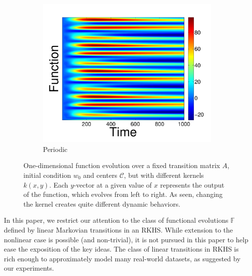 \documentclass[letterpaper,12pt,peerreviewca,draftcls]{IEEEtran}
\newcommand{\weight}{w}
\newcommand{\kernel}{k}
\newcommand{\shCent}{\mathcal{C}}
\begin{document}
\begin{figure}[t]
\begin{subfigure}[t]{0.32\textwidth}
	\includegraphics[width=\linewidth]{"Figure 5c.pdf"}
	\caption{Periodic}
\end{subfigure}
\caption{One-dimensional function evolution over a fixed transition matrix $A$, 
initial condition $\weight_0$ and centers $\shCent$, but with different kernels $\kernel(x,y)$. 
Each $y$-vector at a given value of $x$ represents the output of the function, which evolves from left to right. As seen, changing the kernel creates quite different dynamic behaviors.}
\label{fig:kernel_variation}
\end{figure}


In this paper, we restrict our attention to the class of functional evolutions $\mathbb{F}$ defined by linear Markovian transitions in an RKHS. While extension to the nonlinear case is possible (and non-trivial), it is not pursued in this paper to help ease the exposition of the key ideas. The class of linear transitions in RKHS is rich enough to approximately model many real-world datasets, as suggested by our experiments.
\end{document}
